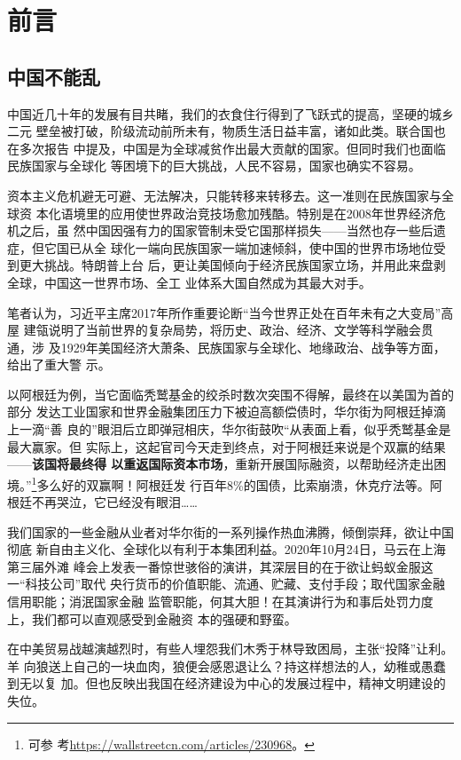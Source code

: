 \chapter{前言}

\section{中国不能乱}

中国近几十年的发展有目共睹，我们的衣食住行得到了飞跃式的提高，坚硬的城乡二元
壁垒被打破，阶级流动前所未有，物质生活日益丰富，诸如此类。联合国也在多次报告
中提及，中国是为全球减贫作出最大贡献的国家。但同时我们也面临民族国家与全球化
等困境下的巨大挑战，人民不容易，国家也确实不容易。

资本主义危机避无可避、无法解决，只能转移来转移去。这一准则在民族国家与全球资
本化语境里的应用使世界政治竞技场愈加残酷。特别是在2008年世界经济危机之后，虽
然中国因强有力的国家管制未受它国那样损失——当然也存一些后遗症，但它国已从全
球化一端向民族国家一端加速倾斜，使中国的世界市场地位受到更大挑战。特朗普上台
后，更让美国倾向于经济民族国家立场，并用此来盘剥全球，中国这一世界市场、全工
业体系大国自然成为其最大对手。

笔者认为，习近平主席2017年所作重要论断“当今世界正处在百年未有之大变局”高屋
建瓴说明了当前世界的复杂局势，将历史、政治、经济、文学等科学融会贯通，涉
及1929年美国经济大萧条、民族国家与全球化、地缘政治、战争等方面，给出了重大警
示。

以阿根廷为例，当它面临秃鹫基金的绞杀时数次突围不得解，最终在以美国为首的部分
发达工业国家和世界金融集团压力下被迫高额偿债时，华尔街为阿根廷掉滴上一滴“善
良的”眼泪后立即弹冠相庆，华尔街鼓吹“从表面上看，似乎秃鹫基金是最大赢家。但
实际上，这起官司今天走到终点，对于阿根廷来说是个双赢的结果——\textbf{该国将最终得
  以重返国际资本市场}，重新开展国际融资，以帮助经济走出困境。”\footnote{可参
  考\url{https://wallstreetcn.com/articles/230968}。}多么好的双赢啊！阿根廷发
行百年8\%的国债，比索崩溃，休克疗法等。阿根廷不再哭泣，它已经没有眼泪……

我们国家的一些金融从业者对华尔街的一系列操作热血沸腾，倾倒崇拜，欲让中国彻底
新自由主义化、全球化以有利于本集团利益。2020年10月24日，马云在上海第三届外滩
峰会上发表一番惊世骇俗的演讲，其深层目的在于欲让蚂蚁金服这一“科技公司”取代
央行货币的价值职能、流通、贮藏、支付手段；取代国家金融信用职能；消泯国家金融
监管职能，何其大胆！在其演讲行为和事后处罚力度上，我们都可以直观感受到金融资
本的强硬和野蛮。

在中美贸易战越演越烈时，有些人埋怨我们木秀于林导致困局，主张“投降”让利。羊
向狼送上自己的一块血肉，狼便会感恩退让么？持这样想法的人，幼稚或愚蠢到无以复
加。但也反映出我国在经济建设为中心的发展过程中，精神文明建设的失位。

